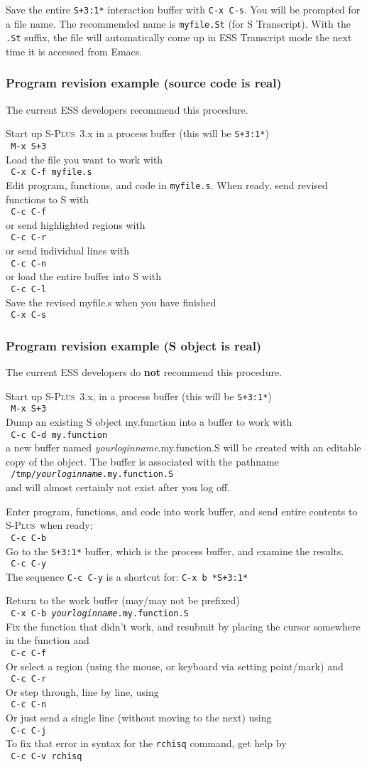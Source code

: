 \documentclass{article}
\newcommand*{\Splus}{\textsc{S-Plus}}
\newcommand{\elcode}[1]{\\{\tt\hspace*{2em} #1}\\}
\begin{document}
Save the entire {\tt *S+3:1*} interaction buffer with {\tt C-x C-s}.  You
will be prompted for a file name.  The recommended name is
{\tt myfile.St} (for S Transcript).  With the {\tt *.St} suffix,
the file will automatically come up in ESS
Transcript mode the next time it is accessed from Emacs.


\subsubsection{Program revision example (source code is real)}
The current ESS developers recommend this procedure.

\noindent
Start up \Splus~3.x in a process buffer (this will be {\tt *S+3:1*})
  \elcode{M-x S+3}
Load the file you want to work with
  \elcode{C-x C-f myfile.s}
Edit program, functions, and code in {\tt myfile.s}.
When ready, send revised functions to S with
  \elcode{C-c C-f}
or send highlighted regions with
  \elcode{C-c C-r}
or send individual lines with
  \elcode{C-c C-n}
or load the entire buffer into S with
  \elcode{C-c C-l}
Save the revised myfile.s when you have finished
  \elcode{C-x C-s}

\subsubsection{Program revision example (S object is real)}
The current ESS developers do {\bf not} recommend this procedure.

\noindent
Start up \Splus~3.x, in a process buffer (this will be {\tt *S+3:1*}) 
  \elcode{M-x S+3}
Dump an existing S object my.function into a buffer to work with
  \elcode{C-c C-d my.function}
a new buffer named \textit{yourloginname}.my.function.S will be created with
an editable copy of the object.  The buffer is associated with the
pathname
 \elcode{/tmp/\textit{yourloginname}.my.function.S}
and will almost certainly not exist after you log off.

Enter program, functions, and code into work buffer,
and send entire contents to \Splus\ when ready:
  \elcode{C-c C-b}
Go to the {\tt *S+3:1*} buffer, which is the process buffer, and examine
the results.
  \elcode{C-c C-y}
The sequence {\tt C-c C-y} is a shortcut for:  {\tt C-x b *S+3:1*}

Return to the work buffer (may/may not be prefixed)
  \elcode{C-x C-b \textit{yourloginname}.my.function.S}
Fix the function that didn't work, and resubmit by
placing the cursor somewhere in the function and
  \elcode{C-c C-f}
Or select a region (using the mouse, or keyboard
via setting point/mark) and
  \elcode{C-c C-r}
Or step through, line by line, using
  \elcode{C-c C-n}
Or just send a single line (without moving to the next) using
  \elcode{C-c C-j}
To fix that error in syntax for the {\tt rchisq} command, get help
by
  \elcode{C-c C-v rchisq}
\end{document}
